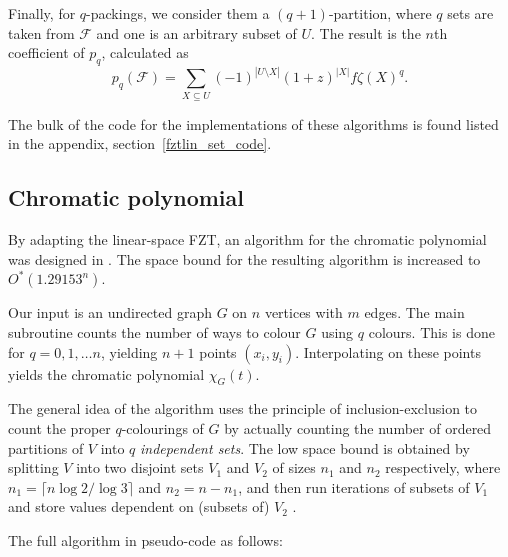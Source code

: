 \documentclass{cslthse-msc}
\begin{document}
Finally, for $q$-packings, we consider them a $(q+1)$-partition, where $q$ sets are taken from $\mathcal{F}$ and one is an arbitrary subset of $U$. The result is the $n$th coefficient of $p_q$, calculated as
\[
 p_q(\mathcal{F}) = \sum_{X \subseteq U} (-1)^{|U \setminus X|} (1+z)^{|X|}f\zeta(X)^q.
\]

The bulk of the code for the implementations of these algorithms is found listed in the appendix, section~\ref{fztlin_set_code}.

\subsection{Chromatic polynomial}\label{bhkk}
By adapting the linear-space FZT, an algorithm for the chromatic polynomial was designed in \cite{cov_pack}. The space bound for the resulting algorithm is increased to $O^*(1.29153^n)$.

Our input is an undirected graph $G$ on $n$ vertices with $m$ edges. The main subroutine counts the number of ways to colour $G$ using $q$ colours. This is done for $q = 0, 1, \ldots n$, yielding $n + 1$ points $(x_i, y_i)$. Interpolating on these points yields the chromatic polynomial $\chi_G(t)$.

The general idea of the algorithm uses the principle of inclusion-exclusion to count the proper $q$-colourings of $G$ by actually counting the number of ordered partitions of $V$ into $q$ \emph{independent sets}. The low space bound is obtained by splitting $V$ into two disjoint sets $V_1$ and $V_2$ of sizes $n_1$ and $n_2$ respectively, where $n_1 = \lceil n \log2 / \log3 \rceil$ and $n_2 = n - n_1$, and then run iterations of subsets of $V_1$ and store values dependent on (subsets of) $V_2$ \cite[sec. 5]{cov_pack}. 

The full algorithm in pseudo-code as follows:
\end{document}
